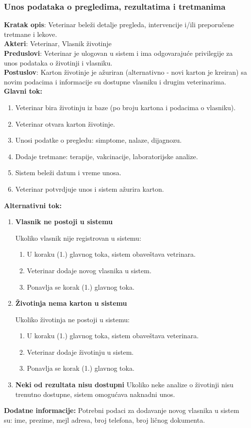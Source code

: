 \subsubsection{Unos podataka o pregledima, rezultatima i tretmanima}
\indent \textbf{Kratak opis}: Veterinar beleži detalje pregleda, intervencije i/ili preporučene tretmane i lekove.\\
\textbf{Akteri}: Veterinar, Vlasnik životinje\\
\textbf{Preduslovi}: Veterinar je ulogovan u sistem i ima odgovarajuće privilegije za unos podataka o životinji i vlasniku. \\
\textbf{Postuslov}: Karton životinje je ažuriran (alternativno - novi karton je kreiran) sa novim podacima i informacije su dostupne vlasniku i drugim veterinarima. \\
\textbf{Glavni tok:}
\begin{enumerate}
    \item Veterinar bira životinju iz baze (po broju kartona i podacima o vlasniku).
    \item Veterinar otvara karton životinje.
    \item Unosi podatke o pregledu: simptome, nalaze, dijagnozu.
    \item Dodaje tretmane: terapije, vakcinacije, laboratorijske analize.
    \item Sistem beleži datum i vreme unosa.
    \item Veterinar potvrdjuje unos i sistem ažurira karton. 
\end{enumerate}
\indent \textbf{Alternativni tok:}
\begin{enumerate}
    \item[A1.]\textbf{Vlasnik ne postoji u sistemu} 
    
    Ukoliko vlasnik nije registrovan u sistemu:
    \begin{enumerate}
        \item U koraku (1.) glavnog toka, sistem obaveštava vetrinara.
        \item Veterinar dodaje novog vlasnika u sistem. 
        \item Ponavlja se korak (1.) glavnog toka.
    \end{enumerate}
    \item[A2.]\textbf{Životinja nema karton u sistemu} 
    
    Ukoliko životinja ne postoji u sistemu:
    \begin{enumerate}
        \item U koraku (1.) glavnog toka, sistem obaveštava veterinara.
        \item Veterinar dodaje životinju u sistem. 
        \item Ponavlja se korak (1.) glavnog toka.
    \end{enumerate}
    \item[A3.]\textbf{Neki od rezultata nisu dostupni} Ukoliko neke analize o životinji nisu trenutno dostupne, sistem omogućava naknadni unos.
\end{enumerate}
\textbf{Dodatne informacije:}
Potrebni podaci za dodavanje novog vlasnika u sistem su: ime, prezime, mejl adresa, broj telefona, broj ličnog dokumenta.

